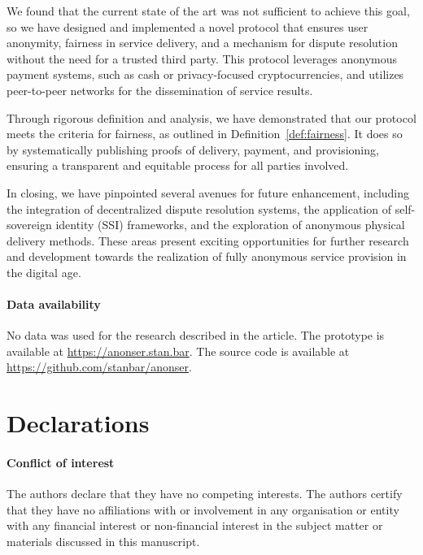 \documentclass[pdftex,twocolumn,epjc3]{svjour3}
\begin{document}
We found that the current state of the art was not sufficient to achieve this goal, so we have designed and implemented a novel protocol that ensures user anonymity, fairness in service delivery, and a mechanism for dispute resolution without the need for a trusted third party. This protocol leverages anonymous payment systems, such as cash or privacy-focused cryptocurrencies, and utilizes peer-to-peer networks for the dissemination of service results.

\begin{sloppypar}
Through rigorous definition and analysis, we have demonstrated that our protocol meets the criteria for fairness, as outlined in Definition~\ref{def:fairness}. It does so by systematically publishing proofs of delivery, payment, and provisioning, ensuring a transparent and equitable process for all parties involved.
\end{sloppypar}

In closing, we have pinpointed several avenues for future enhancement, including the integration of decentralized dispute resolution systems, the application of self-sovereign identity (SSI) frameworks, and the exploration of anonymous physical delivery methods. These areas present exciting opportunities for further research and development towards the realization of fully anonymous service provision in the digital age.

\paragraph{Data availability}
No data was used for the research described in the article.
The prototype is available at \url{https://anonser.stan.bar}. 
The source code is available at \url{https://github.com/stanbar/anonser}.

\section*{Declarations}

\paragraph{Conflict of interest} The authors declare that they have no competing interests. The authors certify that they have no affiliations with or involvement in any organisation or entity with any financial interest or non-financial interest in the subject matter or materials discussed in this manuscript.
\end{document}
